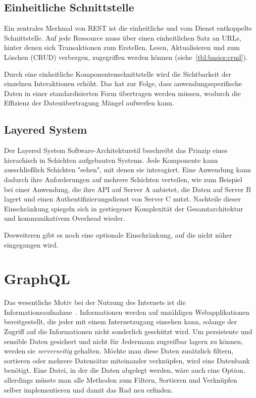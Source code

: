 \subsection{Einheitliche Schnittstelle}
Ein zentrales Merkmal von REST ist die einheitliche und vom Dienst entkoppelte Schnittstelle.
Auf jede Ressource muss über einen einheitlichen Satz an URLs, hinter denen sich Transaktionen zum Erstellen, Lesen, Aktualisieren
und zum Löschen (CRUD) verbergen, zugegriffen werden können (siehe~\ref{tbl:basics:crud}).

Durch eine einheitliche Komponentenschnittstelle wird die Sichtbarkeit der einzelnen Interaktionen erhöht.
Das hat zur Folge, dass anwendungsspezifische Daten in einer standardisierten Form übertragen werden müssen,
wodurch die Effizienz der Datenübertragung Mängel aufwerfen kann.

\subsection{Layered System}
Der Layered System Software-Architekturstil beschreibt das Prinzip eines hierachisch in Schichten aufgebauten Systems.
Jede Komponente kann ausschließlich Schichten "sehen", mit denen sie interagiert.
Eine Anwendung kann dadurch ihre Anforderungen auf mehrere Schichten verteilen, wie zum Beispiel bei einer Anwendung, die ihre API auf Server A anbietet,
die Daten auf Server B lagert und einen Authentifizierungsdienst von Server C nutzt.
Nachteile dieser Einschränkung spiegeln sich in gestiegener Komplexität der Gesamtarchitektur und kommunikativem Overhead wieder.

Desweiteren gibt es noch eine optionale Einschränkung, auf die nicht näher eingegangen wird.

\section{GraphQL}
\label{sec:basics:graphql}
Das wesentliche Motiv bei der Nutzung des Internets ist die Informationsaufnahme~\cite{statista-1}\cite{ard-zdf}.
Informationen werden auf unzähligen Webapplikationen bereitgestellt, die jeder mit einem Internetzugang einsehen kann,
solange der Zugriff auf die Informationen nicht sonderlich geschützt wird.
Um persistente und sensible Daten gesichert und nicht für Jedermann zugreifbar lagern zu können, werden sie \emph{serverseitig} gehalten.
Möchte man diese Daten zusätzlich filtern, sortieren oder mehrere Datensätze miteinander verknüpfen, wird eine Datenbank benötigt.
Eine Datei, in der die Daten abgelegt werden, wäre auch eine Option, allerdings müsste man alle Methoden zum Filtern, Sortieren und Verknüpfen
selber implementieren und damit das Rad neu erfinden.

